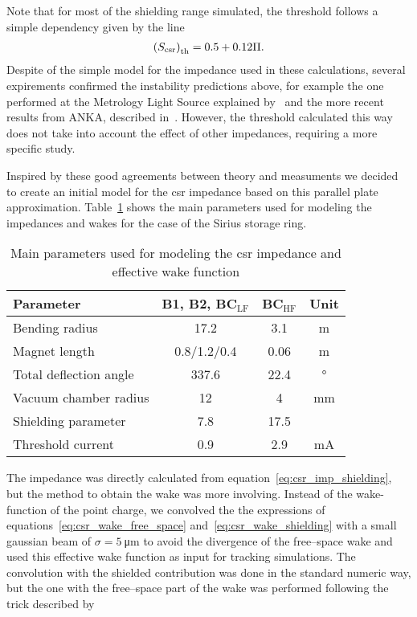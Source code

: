     Note that for most of the shielding range simulated, the threshold follows a simple dependency given by the line
    \begin{align}\label{eq:csr_scaling_instability}
        \left(S_\text{csr}\right)_\text{th} = 0.5 + 0.12\Pi.
    \end{align}
    Despite of the simple model for the impedance used in these calculations, several expirements confirmed the instability predictions above, for example the one performed at the Metrology Light Source explained by~ and the more recent results from ANKA, described in~. However, the threshold calculated this way does not take into account the effect of other impedances, requiring a more specific study.

    Inspired by these good agreements between theory and measuments we decided to create an initial model for the \gls{csr} impedance based on this parallel plate approximation. Table~\ref{tab:csr_main_parameters} shows the main parameters used for modeling the impedances and wakes for the case of the Sirius storage ring.
    \begin{table}
        \centering
        \caption{Main parameters used for modeling the \gls{csr} impedance and effective wake function}
        \label{tab:csr_main_parameters}
        \begin{tabular}{lccc}
            \toprule
            Parameter              & B1, B2, BC$_\text{LF}$ & BC$_\text{HF}$ & Unit \\
            \midrule
            Bending radius         & 17.2             &  3.1  &\si{\meter}\\
            Magnet length          & 0.8/1.2/0.4      &  0.06 &\si{\meter}\\
            Total deflection angle & 337.6            &  22.4 &\si{\degree}\\
            Vacuum chamber radius  & 12               &  4    &\si{\milli\meter}\\
            Shielding parameter    & 7.8              &  17.5 & \\
            Threshold current      & 0.9              &  2.9  & \si{\milli\ampere}\\
            \bottomrule
        \end{tabular}
    \end{table}
    The impedance was directly calculated from equation~\eqref{eq:csr_imp_shielding}, but the method to obtain the wake was more involving. Instead of the wake-function of the point charge, we convolved the the expressions of equations~\eqref{eq:csr_wake_free_space} and~\eqref{eq:csr_wake_shielding} with a small gaussian beam of $\sigma = 5~$\si{\micro\meter} to avoid the divergence of the free--space wake and used this effective wake function as input for tracking simulations. The convolution with the shielded contribution was done in the standard numeric way, but the one with the free--space part of the wake was performed following the trick described by~
